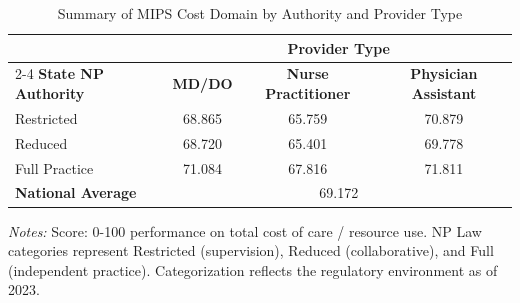 \begin{table}[htbp]
    \centering
    \caption{Summary of MIPS Cost Domain by Authority and Provider Type}
    \label{tab:mips_cost_score_provtype}
    \vspace{0.2cm}
    \begin{tabular}{lccc}
        \toprule
        & \multicolumn{3}{c}{\textbf{Provider Type}} \\
        \cmidrule(lr){2-4}
        \textbf{State NP Authority} & \textbf{MD/DO} & \textbf{Nurse Practitioner} & \textbf{Physician Assistant} \\
        \midrule
        Restricted & 68.865 & 65.759 & 70.879 \\
        Reduced & 68.720 & 65.401 & 69.778 \\
        Full Practice & 71.084 & 67.816 & 71.811 \\
        \midrule
        \textbf{National Average} & \multicolumn{3}{c}{69.172} \\
        \bottomrule
    \end{tabular}
    \vspace{0.1cm}
    \begin{minipage}{0.85\textwidth}
        \footnotesize \textit{Notes:} Score: 0-100 performance on total cost of care / resource use. NP Law categories represent Restricted (supervision), Reduced (collaborative), and Full (independent practice). Categorization reflects the regulatory environment as of 2023.
    \end{minipage}
\end{table}